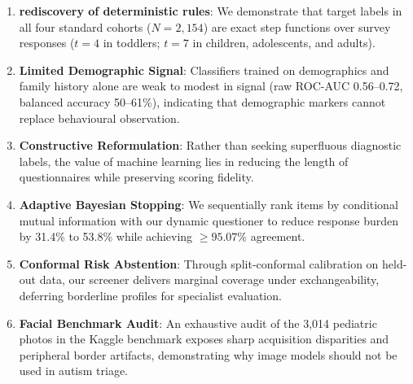 \documentclass[conference]{IEEEtran}
\begin{document}
\begin{enumerate}
    \item \textbf{rediscovery of deterministic rules}: We demonstrate that target labels in all four standard cohorts ($N = 2{,}154$) are exact step functions over survey responses ($t = 4$ in toddlers; $t = 7$ in children, adolescents, and adults).
    \item \textbf{Limited Demographic Signal}: Classifiers trained on demographics and family history alone are weak to modest in signal (raw ROC-AUC 0.56--0.72, balanced accuracy 50--61\%), indicating that demographic markers cannot replace behavioural observation.
    \item \textbf{Constructive Reformulation}: Rather than seeking superfluous diagnostic labels, the value of machine learning lies in reducing the length of questionnaires while preserving scoring fidelity.
    \item \textbf{Adaptive Bayesian Stopping}: We sequentially rank items by conditional mutual information with our dynamic questioner to reduce response burden by 31.4\% to 53.8\% while achieving $\ge 95.07\%$ agreement.
    \item \textbf{Conformal Risk Abstention}: Through split-conformal calibration on held-out data, our screener delivers marginal coverage under exchangeability, deferring borderline profiles for specialist evaluation.
    \item \textbf{Facial Benchmark Audit}: An exhaustive audit of the 3,014 pediatric photos in the Kaggle benchmark exposes sharp acquisition disparities and peripheral border artifacts, demonstrating why image models should not be used in autism triage.
\end{enumerate}
\end{document}
